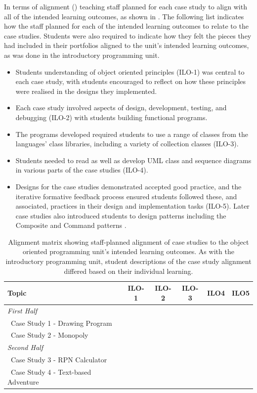 In terms of alignment () teaching staff planned for each case study to align with all of the intended learning outcomes, as shown in . The following list indicates how the staff planned for each of the intended learning outcomes to relate to the case studies. Students were also required to indicate how they felt the pieces they had included in their portfolios aligned to the unit's intended learning outcomes, as was done in the introductory programming unit. 
\begin{itemize}[noitemsep,nolistsep]
	\item Students understanding of object oriented principles (ILO-1) was central to each case study, with students encouraged to reflect on how these principles were realised in the designs they implemented. 
	\item Each case study involved aspects of design, development, testing, and debugging (ILO-2) with students building functional programs. 
	\item The programs developed required students to use a range of classes from the languages' class libraries, including a variety of collection classes (ILO-3).
	\item Students needed to read as well as develop UML class and sequence diagrams in various parts of the case studies (ILO-4).
	\item Designs for the case studies demonstrated accepted good practice, and the iterative formative feedback process ensured students followed these, and associated, practices in their design and implementation tasks (ILO-5). Later case studies also introduced students to design patterns including the Composite and Command patterns \cite{Gamma:2001}.
\end{itemize}

\begin{table}[b]
	\centering
	\caption{Alignment matrix showing staff-planned alignment of case studies to the object oriented programming unit's intended learning outcomes. As with the introductory programming unit, student descriptions of the case study alignment differed based on their individual learning.}
	\label{tbl:oop_matrix}
	\begin{tabular}{l|ccccc}
		\textbf{Topic} 								& \textbf{ILO-1} & \textbf{ILO-2} & \textbf{ILO-3} & \textbf{ILO4} & \textbf{ILO5} \\ \hline
		\emph{First Half} & & & & & \\
		~Case Study 1 - Drawing Program & \checkmark & \checkmark & \checkmark & \checkmark & \checkmark \\
		~Case Study 2 - Monopoly & \checkmark & \checkmark & \checkmark & \checkmark & \checkmark \\
		\hline
		\emph{Second Half} & & & & & \\
		~Case Study 3 - RPN Calculator & \checkmark & \checkmark & \checkmark & \checkmark & \checkmark \\
		~Case Study 4 - Text-based Adventure & \checkmark & \checkmark & \checkmark & \checkmark & \checkmark \\
	\end{tabular}
\end{table}

